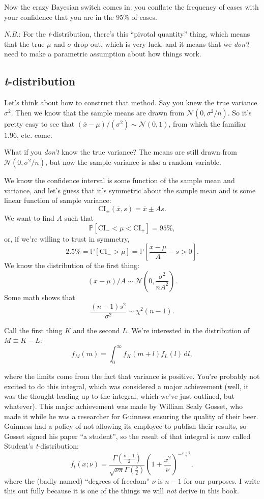 \documentclass{book}
\begin{document}
Now the crazy Bayesian switch comes in: you conflate the frequency of
cases with your confidence that you are in the 95\% of cases.

\emph{N.B.}: For the \emph{t}-distribution, there's this ``pivotal
quantity'' thing, which means that the true \(\mu\) and \(\sigma\) drop
out, which is very luck, and it means that we \emph{don't} need to make
a parametric assumption about how things work.

\subsection{\texorpdfstring{\emph{t}-distribution}{t-distribution}}\label{t-distribution}

Let's think about how to construct that method. Say you knew the true
variance \(\sigma^2\). Then we know that the sample means are drawn from
\(\mathcal{N}(0, \sigma^2/n)\). So it's pretty easy to see that
\((\overline{x} - \mu) / (\sigma^2) \sim \mathcal{N}(0, 1)\), from which
the familiar \(1.96\), etc. come.

What if you \emph{don't} know the true variance? The means are still
drawn from \(\mathcal{N}(0, \sigma^2/n)\), but now the sample variance
is also a random variable.

We know the confidence interval is some function of the sample mean and
variance, and let's guess that it's symmetric about the sample mean and
is some linear function of sample variance: \[
\mathrm{CI}_\pm(\overline{x}, s) = \overline{x} \pm A s.
\] We want to find \(A\) such that \[
\mathbb{P}\left[ \mathrm{CI}_- < \mu < \mathrm{CI}_+ \right] = 95\%,
\] or, if we're willing to trust in symmetry, \[
2.5\% = \mathbb{P}\left[ \mathrm{CI}_- > \mu \right] = \mathbb{P}\left[ \frac{\overline{x} - \mu}{A} - s > 0 \right].
\] We know the distribution of the first thing: \[
(\overline{x}-\mu)/A \sim \mathcal{N}\left(0, \frac{\sigma^2}{n A^2}\right).
\] Some math shows that \[
\frac{(n-1) s^2}{\sigma^2} \sim \chi^2(n-1).
\]

Call the first thing \(K\) and the second \(L\). We're interested in the
distribution of \(M \equiv K - L\): \[
f_M(m) = \int_0^\infty f_K(m + l) f_L(l) \,\mathrm{d}l,
\]

where the limits come from the fact that variance is positive. You're
probably not excited to do this integral, which was considered a major
achievement (well, it was the thought leading up to the integral, which
we've just outlined, but whatever). This major achievement was made by
William Sealy Gosset, who made it while he was a researcher for Guinness
ensuring the quality of their beer. Guinness had a policy of not
allowing its employee to publish their results, so Gosset signed his
paper ``a student'', so the result of that integral is now called
Student's \emph{t}-distribution: \[
f_t(x; \nu) = \frac{\Gamma(\frac{\nu+1}{2})}{\sqrt{\nu\pi} \Gamma\left(\frac{\nu}{2}\right)}
  \left(1+ \frac{x^2}{\nu}\right)^{-\frac{\nu+1}{2}},
\] where the (badly named) ``degrees of freedom'' \(\nu\) is \(n-1\) for
our purposes. I write this out fully because it is one of the things we
will \emph{not} derive in this book.
\end{document}
